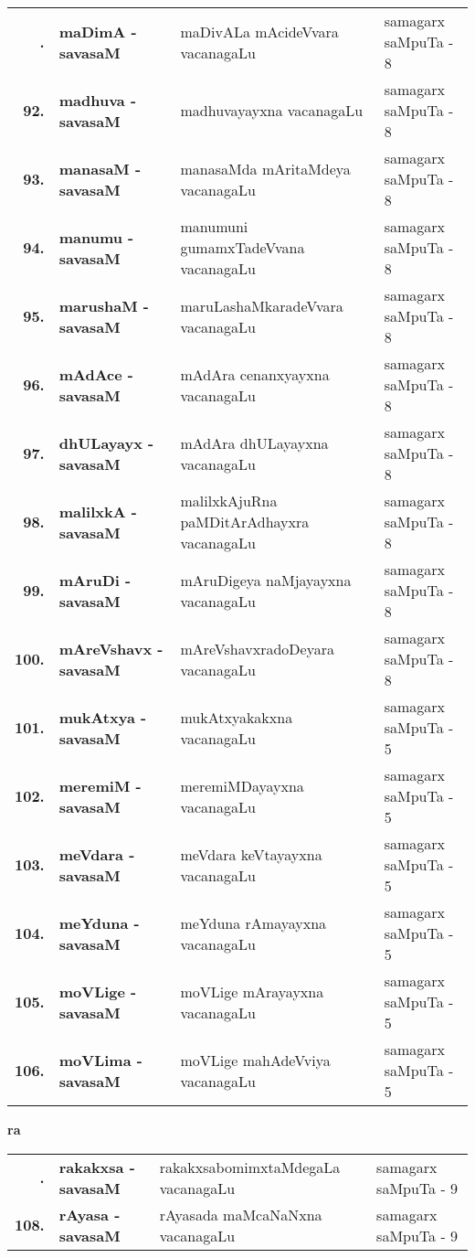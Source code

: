 {\renewcommand{\arraystretch}{1.35}
\begin{longtable}{>{\bf}r>{\bf}l>{\raggedright}p{8cm}l}
\endfirsthead
\endhead
\endfoot
\endlastfoot
91. & maDimA - savasaM &  maDivALa mAcideVvara vacanagaLu & samagarx saMpuTa - 8\\
92. & madhuva - savasaM &  madhuvayayxna vacanagaLu & samagarx saMpuTa - 8\\
93. & manasaM - savasaM & manasaMda mAritaMdeya vacanagaLu & samagarx saMpuTa - 8 \\
94. & manumu - savasaM & manumuni gumamxTadeVvana vacanagaLu & samagarx saMpuTa - 8 \\
95. & marushaM - savasaM & maruLashaMkaradeVvara vacanagaLu & samagarx saMpuTa - 8 \\
96. & mAdAce - savasaM & mAdAra cenanxyayxna vacanagaLu & samagarx saMpuTa - 8 \\
97. & dhULayayx - savasaM & mAdAra dhULayayxna vacanagaLu & samagarx saMpuTa - 8 \\
98. & malilxkA - savasaM & malilxkAjuRna paMDitArAdhayxra vacanagaLu & samagarx saMpuTa - 8 \\
99. & mAruDi - savasaM & mAruDigeya naMjayayxna vacanagaLu & samagarx saMpuTa - 8 \\
100. & mAreVshavx - savasaM & mAreVshavxradoDeyara vacanagaLu & samagarx saMpuTa - 8 \\
101. & mukAtxya - savasaM & mukAtxyakakxna vacanagaLu & samagarx saMpuTa - 5 \\
102. & meremiM - savasaM & meremiMDayayxna vacanagaLu & samagarx saMpuTa - 5 \\
103. & meVdara - savasaM & meVdara keVtayayxna vacanagaLu & samagarx saMpuTa - 5 \\
104. & meYduna - savasaM & meYduna rAmayayxna vacanagaLu & samagarx saMpuTa - 5 \\
105. & moVLige - savasaM & moVLige mArayayxna vacanagaLu & samagarx saMpuTa - 5 \\
106. & moVLima - savasaM & moVLige mahAdeVviya vacanagaLu & samagarx saMpuTa - 5
\end{longtable}}
\smallskip

\centerline{\bf ra}

{\renewcommand{\arraystretch}{1.3}
\begin{longtable}{>{\bf}r>{\bf}l>{\raggedright}p{8cm}l}
\endfirsthead
\endhead
\endfoot
\endlastfoot
107. & rakakxsa - savasaM & rakakxsabomimxtaMdegaLa vacanagaLu &  samagarx saMpuTa - 9\\
108. & rAyasa - savasaM &  rAyasada maMcaNaNxna vacanagaLu & samagarx saMpuTa - 9
\end{longtable}}

